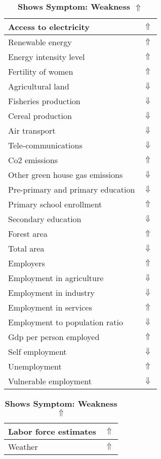 \documentclass[12pt,notitlepage,oneside]{report}
\begin{document}
\begin{table}[!htb]
\caption{\textbf{Shows Symptom: Weakness $\Uparrow$}}
\centering
\label{Correlated Socio-economic Factors0}
\begin{tabular}{|l|l|}
\hline
Access to electricity & $\Uparrow$\\ \hline
Renewable energy & $\Uparrow$\\ \hline
Energy intensity level & $\Uparrow$\\ \hline
Fertility of women & $\Uparrow$\\ \hline
Agricultural land & $\Downarrow$\\ \hline
Fisheries production & $\Downarrow$\\ \hline
Cereal production & $\Downarrow$\\ \hline
Air transport  & $\Downarrow$\\ \hline
Tele-communications & $\Downarrow$\\ \hline
Co2 emissions & $\Uparrow$\\ \hline
Other green house gas emissions & $\Downarrow$\\ \hline
Pre-primary and primary education & $\Downarrow$\\ \hline
Primary school enrollment & $\Uparrow$\\ \hline
Secondary education & $\Downarrow$\\ \hline
Forest area & $\Uparrow$\\ \hline
Total area & $\Downarrow$\\ \hline
Employers & $\Uparrow$\\ \hline
Employment in agriculture & $\Downarrow$\\ \hline
Employment in industry & $\Downarrow$\\ \hline
Employment in services & $\Uparrow$\\ \hline
Employment to population ratio & $\Downarrow$\\ \hline
Gdp per person employed & $\Uparrow$\\ \hline
Self employment & $\Downarrow$\\ \hline
Unemployment & $\Uparrow$\\ \hline
Vulnerable employment & $\Downarrow$\\ \hline
\end{tabular}
\begin{tabular}{|l|l|}
\hline
Labor force estimates & $\Uparrow$\\ \hline
Weather & $\Uparrow$\\ \hline

\end{tabular}
\end{table}
\end{document}
